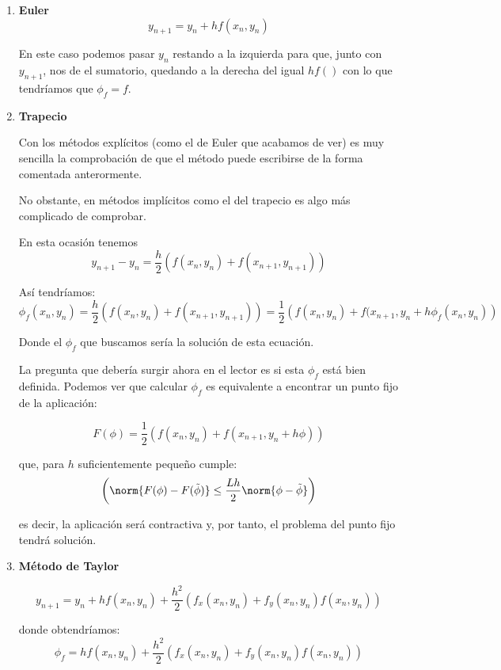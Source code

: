 \begin{example}
\begin{enumerate}
\item \textbf{Euler}
\[y_{n+1} = y_n+hf(x_n,y_n)\]

En este caso podemos pasar $y_n$ restando a la izquierda para que, junto con $y_{n+1}$, nos de el sumatorio, quedando a la derecha del igual $hf()$ con lo que tendríamos que $\phi_f=f$.

\item \textbf{Trapecio}

Con los métodos explícitos (como el de Euler que acabamos de ver) es muy sencilla la comprobación de que el método puede escribirse de la forma comentada anterormente.

No obstante, en métodos implícitos como el del trapecio es algo más complicado de comprobar.

En esta ocasión tenemos
\[y_{n+1}-y_n = \frac{h}{2}\left(f(x_n,y_n)+f(x_{n+1},y_{n+1}) \right)\]

Así tendríamos:
\[\phi_f (x_n,y_n) = \frac{h}{2}\left(f(x_n,y_n)+f(x_{n+1},y_{n+1}) \right) = \frac{1}{2}\left( f(x_n,y_n) + f(x_{n+1},y_n+h\phi_f(x_n,y_n)\right)\]

Donde el $\phi_f$ que buscamos sería la solución de esta ecuación.

La pregunta que debería surgir ahora en el lector es si esta $\phi_f$ está bien definida. Podemos ver que calcular $\phi_f$ es equivalente a encontrar un punto fijo de la aplicación:

\[F(\phi) = \frac{1}{2} \left(f(x_n,y_n)+f(x_{n+1},y_n+h\phi)\right)\]

que, para $h$ suficientemente pequeño cumple:
\begin{equation}
	\label{eq:F_contractiva}
	\left(\norm{F(\phi)-F(\tilde{\phi})} \leq \frac{Lh}{2}\norm{\phi- \tilde{\phi}}\right)
\end{equation}

es decir, la aplicación será contractiva y, por tanto, el problema del punto fijo tendrá solución.

\item \textbf{Método de Taylor}

\[y_{n+1}=y_n+hf(x_n,y_n)+\frac{h^2}{2}\left(f_x(x_n,y_n)+f_y(x_n,y_n)f(x_n,y_n)\right)\]

donde obtendríamos:
\[\phi_f = hf(x_n,y_n)+\frac{h^2}{2}\left(f_x(x_n,y_n)+f_y(x_n,y_n)f(x_n,y_n)\right)\]
\end{enumerate}
\end{example}

